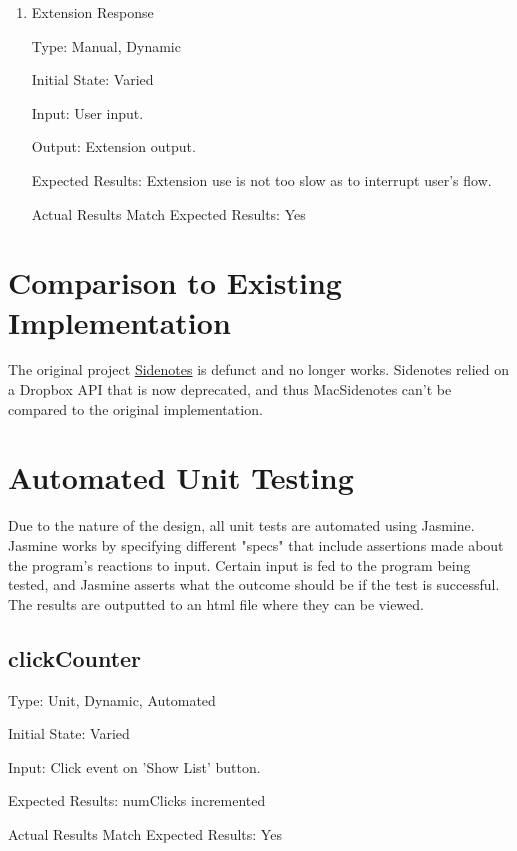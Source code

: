 \documentclass[12pt, titlepage]{article}
\begin{document}
\begin{enumerate}
	
	\item{Extension Response\\}
	
	Type: Manual, Dynamic
	
	Initial State: Varied
	
	Input: User input.
	
	Output: Extension output.
	
	Expected Results: Extension use is not too slow as to interrupt user's flow.
	
	Actual Results Match Expected Results: Yes
	
\end{enumerate}
	
\section{Comparison to Existing Implementation}	

The original project 
\href{https://github.com/sidenotes/sidenotes}{Sidenotes} is defunct and no 
longer works. Sidenotes relied on a Dropbox API that is now deprecated, and 
thus MacSidenotes can't be compared to the original implementation.

\section{Automated Unit Testing}

Due to the nature of the design, all unit tests are automated using Jasmine. 
Jasmine works by specifying different "specs" that include assertions made 
about the program's reactions to input. Certain input is fed to the program 
being tested, and Jasmine asserts what the outcome should be if the test is 
successful. The results are outputted to an html file where they can be viewed.



\subsection{clickCounter}

	Type: Unit, Dynamic, Automated

	Initial State: Varied

	Input: Click event on 'Show List' button.

	Expected Results: numClicks incremented

	Actual Results Match Expected Results: Yes
	
\end{document}
